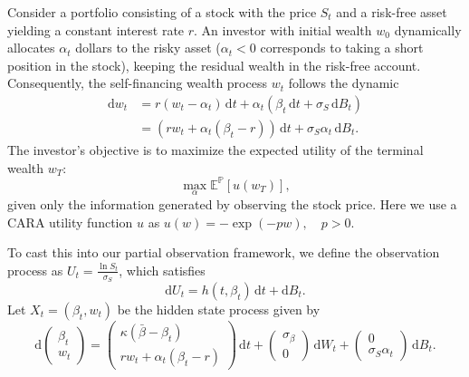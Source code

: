 \documentclass[11pt]{article}
\numberwithin{equation}{section}
\theoremstyle{plain}
\theoremstyle{definition}
\theoremstyle{remark}
\newcommand{\dd}{\mathrm{d}}
\begin{document}
	Consider a portfolio consisting of a stock with the price $S_t$ and a risk-free asset yielding a constant interest rate $r$. An investor with initial wealth $w_0$ dynamically allocates $\alpha_t$ dollars to the risky asset ($\alpha_t<0$ corresponds to taking a short position in the stock), keeping the residual wealth in the risk-free account. Consequently, the self-financing wealth process $w_t$ follows the dynamic 
	\begin{equation*}
		\begin{aligned}
			\dd w_t &= r(w_t-\alpha_t)\,\dd t + \alpha_t(\beta_t \,\dd t + \sigma_S \,\dd B_t) \\
			&= \left( rw_t + \alpha_t (\beta_t - r) \right)\,\dd t + \sigma_S \alpha_t \,\dd B_t. 
		\end{aligned}
	\end{equation*}
	The investor's objective is to maximize the expected utility of the terminal wealth $w_T$:  
	\begin{equation*}
		\max_{\alpha} \mathbb{E}^{\mathbb{P}}[u(w_T)], 
	\end{equation*}
	given only the information generated by observing the stock price. Here we use a CARA utility function $u$ as $u(w) = -\exp(-pw), \quad p>0$.
	
	To cast this into our partial observation framework, we define the observation process as $U_t = \frac{\ln S_t}{\sigma_S}$, which satisfies 
	\begin{equation*}
		\dd U_t = h(t,\beta_t)\,\dd t + \dd B_t. 
	\end{equation*}
	Let $X_t = (\beta_t, w_t)$ be the hidden state process given by 
	\begin{equation*}
		\dd\begin{pmatrix}
			\beta_t \\
			w_t
		\end{pmatrix} = \begin{pmatrix}
			\kappa(\bar{\beta} - \beta_t) \\
			rw_t + \alpha_t (\beta_t - r)
		\end{pmatrix} \,\dd t + \begin{pmatrix}
			\sigma_\beta \\
			0
		\end{pmatrix}\,\dd W_t + \begin{pmatrix}
			0 \\
			\sigma_S \alpha_t
		\end{pmatrix} \,\dd B_t. 
	\end{equation*}
	
\end{document}
